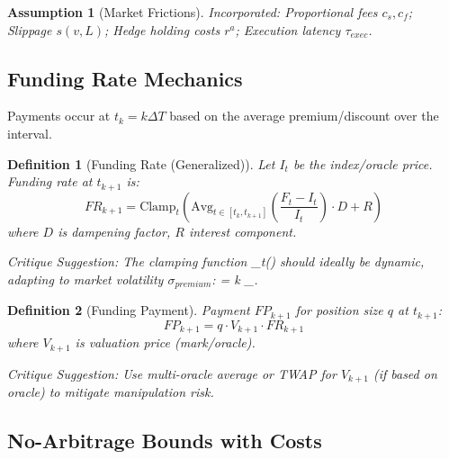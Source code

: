 \documentclass{article}
\newtheorem{definition}{Definition}
\newtheorem{assumption}{Assumption}
\begin{document}
\begin{assumption}[Market Frictions]
Incorporated: Proportional fees $c_s, c_f$; Slippage $s(v,L)$; Hedge holding costs $r^a$; Execution latency $\tau_{exec}$.
\end{assumption}

\subsection{Funding Rate Mechanics}

Payments occur at $t_k = k \Delta T$ based on the average premium/discount over the interval.

\begin{definition}[Funding Rate (Generalized)]
Let $I_t$ be the index/oracle price. Funding rate at $t_{k+1}$ is:
\begin{equation}
    FR_{k+1} = \text{Clamp}_t\left( \text{Avg}_{t \in [t_k, t_{k+1}]} \left( \frac{F_t - I_t}{I_t} \right) \cdot D + R \right)
\end{equation}
where $D$ is dampening factor, $R$ interest component.

\textit{Critique Suggestion:} The clamping function _t(\cdot) should ideally be dynamic, adapting to market volatility $\sigma_{premium}$:  = \pm k \cdot \sigma_{}.
\end{definition}

\begin{definition}[Funding Payment]
Payment $FP_{k+1}$ for position size $q$ at $t_{k+1}$:
\begin{equation}
    FP_{k+1} = q \cdot V_{k+1} \cdot FR_{k+1}
\end{equation}
where $V_{k+1}$ is valuation price (mark/oracle).

\textit{Critique Suggestion:} Use multi-oracle average or TWAP for $V_{k+1}$ (if based on oracle) to mitigate manipulation risk.
\end{definition}

\subsection{No-Arbitrage Bounds with Costs}
\end{document}
